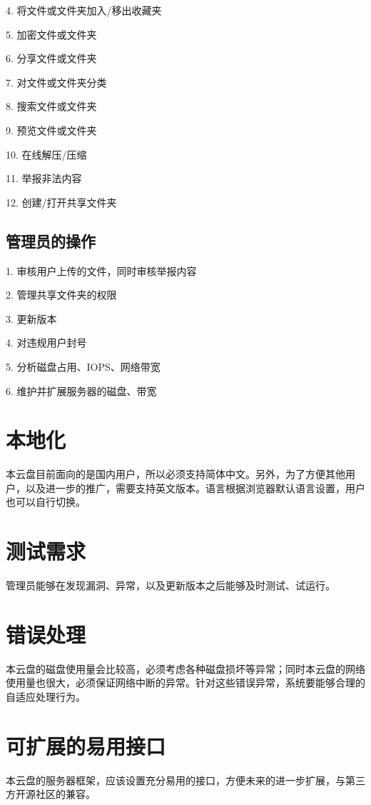     4. 将文件或文件夹加入/移出收藏夹

    5. 加密文件或文件夹
    
    6. 分享文件或文件夹

    7. 对文件或文件夹分类

    8. 搜索文件或文件夹

    9. 预览文件或文件夹

    10. 在线解压/压缩

    11. 举报非法内容

    12. 创建/打开共享文件夹

\subsection{管理员的操作}

    1. 审核用户上传的文件，同时审核举报内容

    2. 管理共享文件夹的权限

    3. 更新版本

    4. 对违规用户封号

    5. 分析磁盘占用、IOPS、网络带宽

    6. 维护并扩展服务器的磁盘、带宽

\section{本地化}

本云盘目前面向的是国内用户，所以必须支持简体中文。另外，为了方便其他用户，以及进一步的推广，需要支持英文版本。语言根据浏览器默认语言设置，用户也可以自行切换。

\section{测试需求}
管理员能够在发现漏洞、异常，以及更新版本之后能够及时测试、试运行。

\section{错误处理}
本云盘的磁盘使用量会比较高，必须考虑各种磁盘损坏等异常；同时本云盘的网络使用量也很大，必须保证网络中断的异常。针对这些错误异常，系统要能够合理的自适应处理行为。

\section{可扩展的易用接口}
本云盘的服务器框架，应该设置充分易用的接口，方便未来的进一步扩展，与第三方开源社区的兼容。

